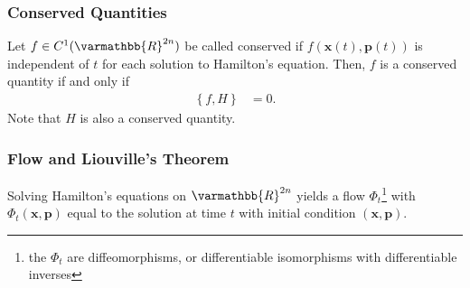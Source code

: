 \documentclass[12pt]{extarticle}
\newcommand{\R}{\varmathbb{R}}
\newcommand{\set}[1]{\left\{#1\right\}}
\theoremstyle{plain}
\theoremstyle{definition}
\theoremstyle{remark}
\renewcommand{\newline}{\hfill\break}
\begin{document}
  \subsubsection{Conserved Quantities}%
  Let $f\in C^{1}(\R^{2n})$ be called conserved if $f(\mathbf{x}(t),\mathbf{p}(t))$ is independent of $t$ for each solution to Hamilton's equation. Then, $f$ is a conserved quantity if and only if
  \begin{align*}
    \set{f,H} &= 0.
  \end{align*}
  Note that $H$ is also a conserved quantity.
  \subsubsection{Flow and Liouville's Theorem}%
  Solving Hamilton's equations on $\R^{2n}$ yields a flow $\Phi_t$\footnote{the $\Phi_t$ are diffeomorphisms, or differentiable isomorphisms with differentiable inverses} with $\Phi_t(\mathbf{x},\mathbf{p})$ equal to the solution at time $t$ with initial condition $(\mathbf{x},\mathbf{p})$.\newline
\end{document}
